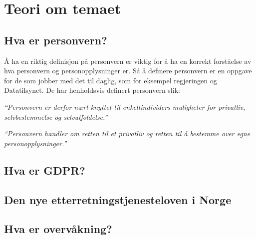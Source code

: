 \section{Teori om temaet}

\subsection{Hva er personvern?}
Å ha en riktig definisjon på personvern er viktig for å ha en korrekt forståelse av hva personvern og personopplysninger er. Så å definere personvern er en oppgave for de som jobber med det til daglig, som for eksempel regjeringen og Datatilsynet. De har henholdsvis definert personvern slik:

\textit{``Personvern er derfor nært knyttet til enkeltindividers muligheter for privatliv, selvbestemmelse og selvutfoldelse.''} \parencite{artikkel:regjeringen_personvern}

\textit{``Personvern handler om retten til et privatliv og retten til å bestemme over egne personopplysninger.''} \parencite{artikkel:datatilsynet_personvern}

\parencite{artikkel:regjeringen_nylov}

\subsection{Hva er GDPR?}

\subsection{Den nye etterretningstjenesteloven i Norge}

\subsection{Hva er overvåkning?}

\newpage